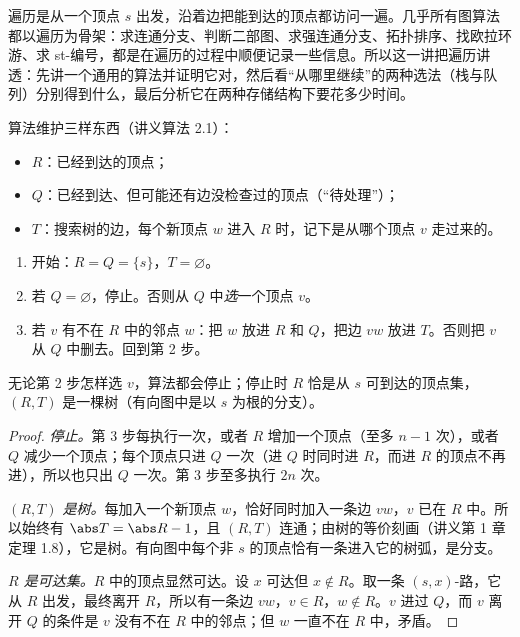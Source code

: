 \label{lec:traversal}

遍历是从一个顶点 $s$ 出发，沿着边把能到达的顶点都访问一遍。几乎所有图算法都以遍历为骨架：求连通分支、判断二部图、求强连通分支、拓扑排序、找欧拉环游、求 st-编号，都是在遍历的过程中顺便记录一些信息。所以这一讲把遍历讲透：先讲一个通用的算法并证明它对，然后看“从哪里继续”的两种选法（栈与队列）分别得到什么，最后分析它在两种存储结构下要花多少时间。


算法维护三样东西（讲义算法 2.1）：
\begin{itemize}
\item $R$：已经到达的顶点；
\item $Q$：已经到达、但可能还有边没检查过的顶点（“待处理”）；
\item $T$：搜索树的边，每个新顶点 $w$ 进入 $R$ 时，记下是从哪个顶点 $v$ 走过来的。
\end{itemize}

\begin{enumerate}
\item 开始：$R=Q=\{s\}$，$T=\varnothing$。
\item 若 $Q=\varnothing$，停止。否则从 $Q$ 中\emph{选}一个顶点 $v$。
\item 若 $v$ 有不在 $R$ 中的邻点 $w$：把 $w$ 放进 $R$ 和 $Q$，把边 $vw$ 放进 $T$。否则把 $v$ 从 $Q$ 中删去。回到第 2 步。
\end{enumerate}

\begin{theorem}\label{thm:traversal:scan}
无论第 2 步怎样选 $v$，算法都会停止；停止时 $R$ 恰是从 $s$ 可到达的顶点集，$(R,T)$ 是一棵树（有向图中是以 $s$ 为根的分支）。
\end{theorem}
\begin{proof}
\emph{停止。}第 3 步每执行一次，或者 $R$ 增加一个顶点（至多 $n-1$ 次），或者 $Q$ 减少一个顶点；每个顶点只进 $Q$ 一次（进 $Q$ 时同时进 $R$，而进 $R$ 的顶点不再进），所以也只出 $Q$ 一次。第 3 步至多执行 $2n$ 次。

\emph{$(R,T)$ 是树。}每加入一个新顶点 $w$，恰好同时加入一条边 $vw$，$v$ 已在 $R$ 中。所以始终有 $\abs T=\abs R-1$，且 $(R,T)$ 连通；由树的等价刻画（讲义第 1 章定理 1.8），它是树。有向图中每个非 $s$ 的顶点恰有一条进入它的树弧，是分支。

\emph{$R$ 是可达集。}$R$ 中的顶点显然可达。设 $x$ 可达但 $x\notin R$。取一条 $(s,x)$-路，它从 $R$ 出发，最终离开 $R$，所以有一条边 $vw$，$v\in R$，$w\notin R$。$v$ 进过 $Q$，而 $v$ 离开 $Q$ 的条件是 $v$ 没有不在 $R$ 中的邻点；但 $w$ 一直不在 $R$ 中，矛盾。
\end{proof}

